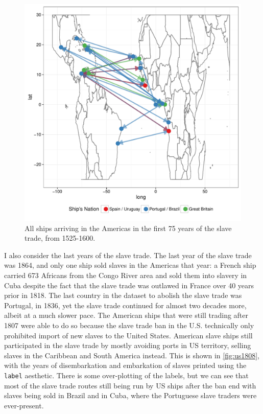 \documentclass[DIV=calc, paper=a4, fontsize=10pt, twocolumn]{scrartcl}\usepackage[]{graphicx}\usepackage[]{color}
\makeatletter
\def\maxwidth{ %
  \ifdim\Gin@nat@width>\linewidth
    \linewidth
  \else
    \Gin@nat@width
  \fi
}
\newenvironment{knitrout}{}{} %
\makeatother
\begin{document}
\begin{knitrout}
\color{fgcolor}\begin{figure}[h]
\includegraphics[width=\maxwidth]{figure/first_years-1} \caption[All ships arriving in the Americas in the first 75 years of the slave trade, from 1525-1600]{All ships arriving in the Americas in the first 75 years of the slave trade, from 1525-1600.}\label{fig:first_years}
\end{figure}


\end{knitrout}

\par I also consider the last years of the slave trade. The last year of the slave trade was 1864, and only one ship sold slaves in the Americas that year: a French ship carried 673 Africans from the Congo River area and sold them into slavery in Cuba despite the fact that the slave trade was outlawed in France over 40 years prior in 1818. The last country in the dataset to abolish the slave trade was Portugal, in 1836, yet the slave trade continued for almost two decades more, albeit at a much slower pace. The American ships that were still trading after 1807 were able to do so because the slave trade ban in the U.S. technically only prohibited import of new slaves to the United States. American slave ships still participated in the slave trade by mostly avoiding ports in US territory, selling slaves in the Caribbean and South America instead. This is shown in \autoref{fig:us1808}, with the years of disembarkation and embarkation of slaves printed using the \texttt{label} aesthetic. There is some over-plotting of the labels, but we can see that most of the slave trade routes still being run by US ships after the ban end with slaves being sold in Brazil and in Cuba, where the Portuguese slave traders were ever-present. 
\end{document}

